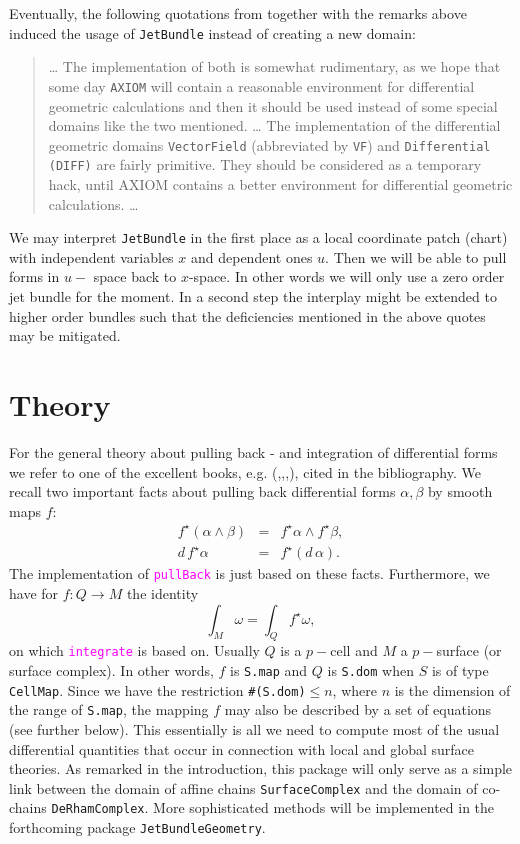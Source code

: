 \documentclass[12pt,a4paper]{article}
\newcommand{\spadfun}[1]{\textcolor{magenta}{\tt #1}}
\begin{document}
Eventually, the following quotations from \cite{wms:axiom} together
with the remarks above induced the usage of {\tt JetBundle}
instead of creating a new domain:
%
\begin{verse}
\ldots
The implementation of both is somewhat rudimentary, as we hope that some
day {\tt AXIOM} will contain a reasonable environment for differential 
geometric calculations and then it should be used instead of some 
special domains like the two mentioned. 
\ldots
The implementation of the differential geometric domains  {\tt VectorField} 
(abbreviated by {\tt VF}) and {\tt Differential (DIFF)} are fairly primitive. 
They should be considered as a temporary hack, until AXIOM contains 
a better environment for differential geometric calculations.
\ldots
\end{verse}  
%
We may interpret {\tt JetBundle} in the first place as a local
coordinate patch (chart) with independent variables $x$ and
dependent ones $u$. Then we will be able to pull forms in $u-$
space back to $x$-space. In other words we will only use a 
zero order jet bundle for the moment. In a second step the
interplay might be extended to higher order bundles such that
the deficiencies mentioned in the above quotes may be mitigated.
%
\section{Theory}
For the general theory about pulling back - and integration of
differential forms we refer to one of the excellent books, e.g.
(\cite{FLAN},\cite{SPV},\cite{MTAA},\cite{CART}), cited in the 
bibliography.
We recall two important facts about pulling back differential
forms $\alpha,\beta$ by smooth maps $f$:
\begin {eqnarray*}
   f^\star (\alpha\wedge\beta) &=& f^\star\alpha\wedge f^\star\beta,\\
   d\, f^\star\alpha &=& f^\star (d\,\alpha). 
\end {eqnarray*} 
The implementation of \spadfun{pullBack} is just based on these facts.
Furthermore, we have for $f:Q \rightarrow M$ the identity
\begin{displaymath}
   \int_{M} \omega = \int_Q f^\star \omega,
\end{displaymath}
on which \spadfun{integrate} is based on. Usually $Q$ is a 
$p-$cell and $M$ a $p-$surface (or surface complex). In other
words, $f$ is {\tt S.map} and $Q$ is {\tt S.dom} when $S$ is
of type {\tt CellMap}.
Since we have the restriction {\tt \#(S.dom)}$\leq n$, where $n$
is the dimension of the range of {\tt S.map}, the mapping $f$
may also be described by a set of equations (see further below).
This essentially is all we need to compute most of the usual
differential quantities that occur in connection with local and
global surface theories. As remarked in the introduction, this
package will only serve as a simple link between the domain of
affine chains {\tt SurfaceComplex} and the domain of co-chains
{\tt DeRhamComplex}. More sophisticated methods will be 
implemented in the forthcoming package {\tt JetBundleGeometry}. 
%
\end{document}

